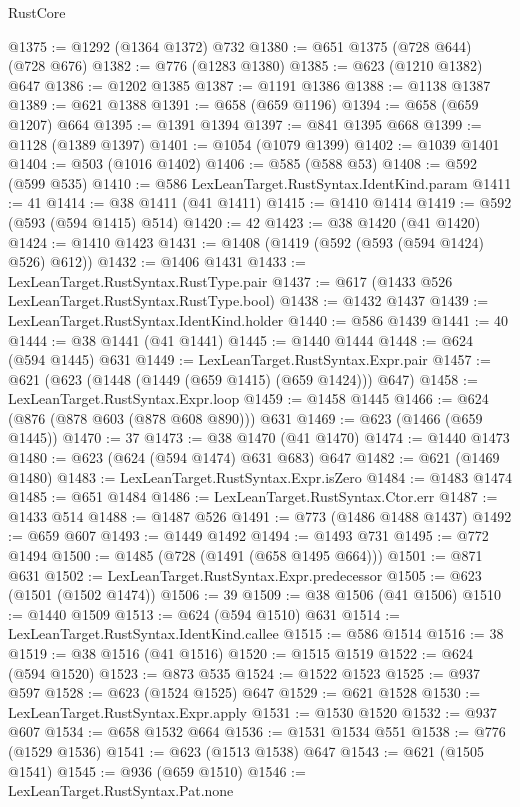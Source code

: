 \begin{lexlean}{RustCore}
\begin{coremodule}
@1375 := @1292 (@1364 @1372) @732
@1380 := @651 @1375 (@728 @644) (@728 @676)
@1382 := @776 (@1283 @1380)
@1385 := @623 (@1210 @1382) @647
@1386 := @1202 @1385
@1387 := @1191 @1386
@1388 := @1138 @1387
@1389 := @621 @1388
@1391 := @658 (@659 @1196)
@1394 := @658 (@659 @1207) @664
@1395 := @1391 @1394
@1397 := @841 @1395 @668
@1399 := @1128 (@1389 @1397)
@1401 := @1054 (@1079 @1399)
@1402 := @1039 @1401
@1404 := @503 (@1016 @1402)
@1406 := @585 (@588 @53)
@1408 := @592 (@599 @535)
@1410 := @586 LexLeanTarget.RustSyntax.IdentKind.param
@1411 := 41
@1414 := @38 @1411 (@41 @1411)
@1415 := @1410 @1414
@1419 := @592 (@593 (@594 @1415) @514)
@1420 := 42
@1423 := @38 @1420 (@41 @1420)
@1424 := @1410 @1423
@1431 := @1408 (@1419 (@592 (@593 (@594 @1424) @526) @612))
@1432 := @1406 @1431
@1433 := LexLeanTarget.RustSyntax.RustType.pair
@1437 := @617 (@1433 @526 LexLeanTarget.RustSyntax.RustType.bool)
@1438 := @1432 @1437
@1439 := LexLeanTarget.RustSyntax.IdentKind.holder
@1440 := @586 @1439
@1441 := 40
@1444 := @38 @1441 (@41 @1441)
@1445 := @1440 @1444
@1448 := @624 (@594 @1445) @631
@1449 := LexLeanTarget.RustSyntax.Expr.pair
@1457 := @621 (@623 (@1448 (@1449 (@659 @1415) (@659 @1424))) @647)
@1458 := LexLeanTarget.RustSyntax.Expr.loop
@1459 := @1458 @1445
@1466 := @624 (@876 (@878 @603 (@878 @608 @890))) @631
@1469 := @623 (@1466 (@659 @1445))
@1470 := 37
@1473 := @38 @1470 (@41 @1470)
@1474 := @1440 @1473
@1480 := @623 (@624 (@594 @1474) @631 @683) @647
@1482 := @621 (@1469 @1480)
@1483 := LexLeanTarget.RustSyntax.Expr.isZero
@1484 := @1483 @1474
@1485 := @651 @1484
@1486 := LexLeanTarget.RustSyntax.Ctor.err
@1487 := @1433 @514
@1488 := @1487 @526
@1491 := @773 (@1486 @1488 @1437)
@1492 := @659 @607
@1493 := @1449 @1492
@1494 := @1493 @731
@1495 := @772 @1494
@1500 := @1485 (@728 (@1491 (@658 @1495 @664)))
@1501 := @871 @631
@1502 := LexLeanTarget.RustSyntax.Expr.predecessor
@1505 := @623 (@1501 (@1502 @1474))
@1506 := 39
@1509 := @38 @1506 (@41 @1506)
@1510 := @1440 @1509
@1513 := @624 (@594 @1510) @631
@1514 := LexLeanTarget.RustSyntax.IdentKind.callee
@1515 := @586 @1514
@1516 := 38
@1519 := @38 @1516 (@41 @1516)
@1520 := @1515 @1519
@1522 := @624 (@594 @1520)
@1523 := @873 @535
@1524 := @1522 @1523
@1525 := @937 @597
@1528 := @623 (@1524 @1525) @647
@1529 := @621 @1528
@1530 := LexLeanTarget.RustSyntax.Expr.apply
@1531 := @1530 @1520
@1532 := @937 @607
@1534 := @658 @1532 @664
@1536 := @1531 @1534 @551
@1538 := @776 (@1529 @1536)
@1541 := @623 (@1513 @1538) @647
@1543 := @621 (@1505 @1541)
@1545 := @936 (@659 @1510)
@1546 := LexLeanTarget.RustSyntax.Pat.none

\end{coremodule}
\end{lexlean}
